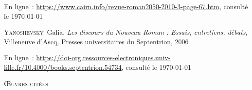 \documentclass[12pt, a4paper]{article}
\begin{document}
            En ligne~: \hyperlink{https://www.cairn.info/revue-roman2050-2010-3-page-67.htm}{https://www.cairn.info/revue-roman2050-2010-3-page-67.htm}, consulté le \today
        \par
    \textsc{Yanoshevsky}~Galia, \textit{Les discours du Nouveau Roman : Essais, entretiens, débats}, Villeneuve d'Ascq, Presses universitaires du Septentrion, 2006
            
            En ligne~: \hyperlink{https://doi-org.ressources-electroniques.univ-lille.fr/10.4000/books.septentrion.54734}{https://doi-org.ressources-electroniques.univ-lille.fr/10.4000/books.septentrion.54734}, consulté le \today
        \par 
    
        \vspace*{2cm}
        \setlength{\parindent}{0cm}
{\large\textsc{Œuvres citées}}
        \vspace*{1cm}
        \setlength{\parindent}{25pt}
        
        
        
\end{document}
